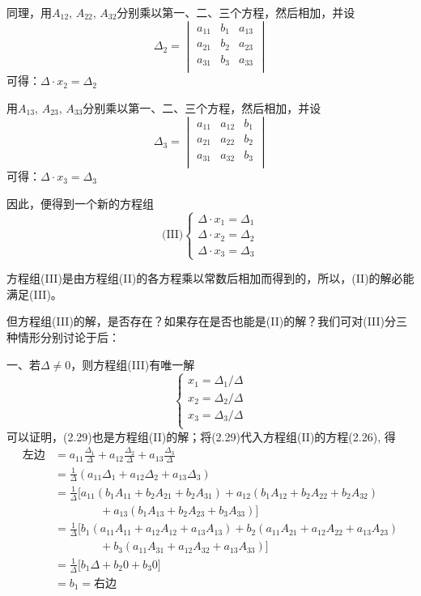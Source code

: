 同理，用$A_{12}$, $A_{22}$, $A_{32}$分别乘以第一、二、三个方程，然后相加，并设
\[\Delta_2=\begin{vmatrix}
    a_{11}&b_1&a_{13}\\
    a_{21}&b_2&a_{23}\\
    a_{31}&b_3&a_{33}\\
\end{vmatrix}\]
可得：$\Delta\cdot  x_2=\Delta_2$

用$A_{13}$, $A_{23}$, $A_{33}$分别乘以第一、二、三个方程，然后相加，并设
\[\Delta_3=\begin{vmatrix}
    a_{11}&a_{12}&b_{1}\\
    a_{21}&a_{22}&b_{2}\\
    a_{31}&a_{32}&b_{3}\\
\end{vmatrix}\]
可得：$\Delta\cdot  x_3=\Delta_3$

因此，便得到一个新的方程组
\[\text{(III)}\begin{cases}
    \Delta\cdot  x_1=\Delta_1\\
    \Delta\cdot  x_2=\Delta_2\\
    \Delta\cdot  x_3=\Delta_3
\end{cases}\]

方程组(III)是由方程组(II)的各方程乘以常数后相加而得到的，所以，(II)的解必能满足(III)。

但方程组(III)的解，是否存在？如果存在是否也能是(II)的解？我们可对(III)分三种情形分别讨论于后：


一、若$\Delta \ne 0$，则方程组(III)有唯一解
\begin{equation}
    \begin{cases}
        x_1=\Delta_1/\Delta\\
        x_2=\Delta_2/\Delta\\
        x_3=\Delta_3/\Delta\\
    \end{cases}
\end{equation}
可以证明，(2.29)也是方程组(II)的解；将(2.29)代入方程组(II)的方程(2.26), 得
\begin{align*}
 \text{左边}&=a_{11}\frac{\Delta_1}{\Delta}+a_{12}\frac{\Delta_2}{\Delta}+a_{13}\frac{\Delta_3}{\Delta}\\   
&=\frac{1}{\Delta}\left(a_{11}\Delta_1+a_{12}\Delta_2+a_{13}\Delta_3\right)\\
&=\frac{1}{\Delta}\big[a_{11}(b_1A_{11}+b_2A_{21}+b_2A_{31})+a_{12}(b_1A_{12}+b_2A_{22}+b_2A_{32})\\
&\qquad \qquad +a_{13}(b_1A_{13}+b_2A_{23}+b_3A_{33})\big]\\
&=\frac{1}{\Delta}\big[b_{1}(a_{11}A_{11}+a_{12}A_{12}+a_{13}A_{13})+b_{2}(a_{11}A_{21}+a_{12}A_{22}+a_{13}A_{23})\\
&\qquad \qquad +b_{3}(a_{11}A_{31}+a_{12}A_{32}+a_{13}A_{33})\big]\\
&=\frac{1}{\Delta}\big[b_1\Delta +b_2 0 +b_3 0\big]\tag{定理10, 11}\\
&=b_1=\text{右边}
\end{align*}

